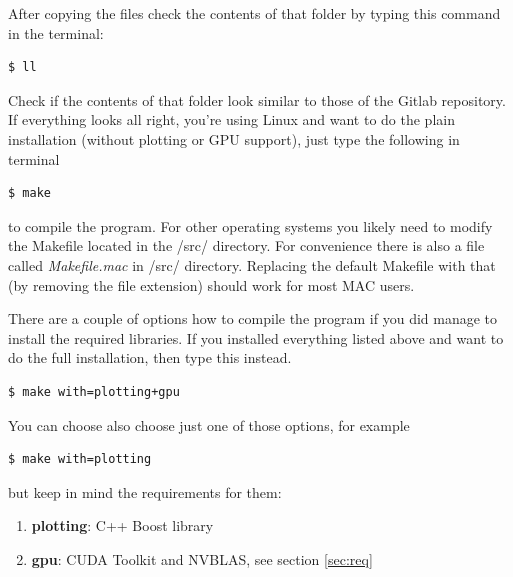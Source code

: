 \documentclass[english,12pt,a4paper,pdftex,sci,utf8]{aaltothesis}
\begin{document}
\noindent After copying the files check the contents of that folder by typing this command in the terminal:
\begin{verbatim}
$ ll
\end{verbatim}
Check if the contents of that folder look similar to those of the Gitlab repository. If everything looks all right, you're using Linux and want to do the plain installation (without plotting or GPU support), just type the following in terminal
\begin{verbatim}
$ make
\end{verbatim}
to compile the program. For other operating systems you likely need to modify the Makefile located in the /src/ directory. For convenience there is also a file called \textit{Makefile.mac} in /src/ directory. Replacing the default Makefile with that (by removing the file extension) should work for most MAC users. 
\par There are a couple of options how to compile the program if you did manage to install the required libraries. If you installed everything listed above and want to do the full installation, then type this instead.
\begin{verbatim}
$ make with=plotting+gpu
\end{verbatim}
You can choose also choose just one of those options, for example
\begin{verbatim}
$ make with=plotting
\end{verbatim} 
but keep in mind the requirements for them:
\begin{enumerate}
\item \textbf{plotting}: C++ Boost library
\item \textbf{gpu}: CUDA Toolkit and NVBLAS, see section \ref{sec:req}
\end{enumerate}
\end{document}
